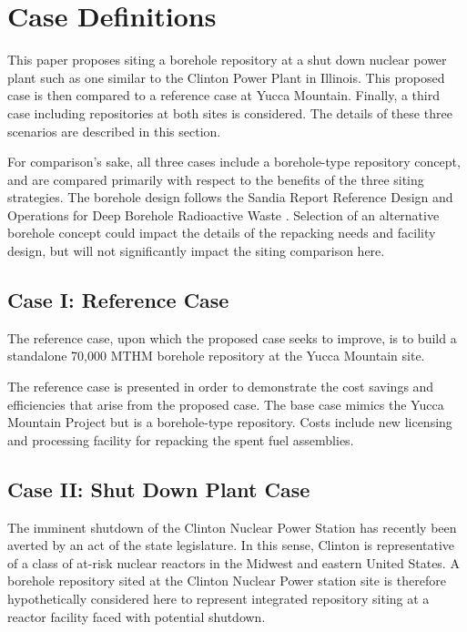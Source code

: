 
\section{Case Definitions}

This paper proposes siting a borehole
 repository at a shut down nuclear power plant such as one similar to the 
 Clinton Power Plant in Illinois. This proposed case is then compared to a 
 reference case at Yucca Mountain. Finally, a third case including repositories 
 at both sites is considered.  The details of these three scenarios are described in this section.

 For comparison's sake, all three cases include a borehole-type repository concept, and are compared 
 primarily with respect to the benefits of the three siting strategies.
The borehole design follows the Sandia Report Reference Design and Operations 
for Deep Borehole Radioactive Waste \cite{arnold_reference_2011}. Selection of 
an alternative borehole concept could impact the details of the repacking needs 
and facility design, but will not significantly impact the siting comparison 
here.
 
\subsection{Case I: Reference Case} 
The reference case, upon which the proposed case seeks to improve, is to build 
a standalone 70,000 \gls{MTHM} borehole repository at the Yucca Mountain site.

The reference case is presented in order to demonstrate the cost savings and efficiencies 
that arise from the proposed case. The base case mimics the Yucca Mountain Project
but is a borehole-type repository. Costs include new licensing and processing facility for repacking the spent fuel assemblies.

\subsection{Case II: Shut Down Plant Case}

The imminent shutdown of the Clinton Nuclear Power Station has recently been 
averted by an act of the state legislature. In this sense, Clinton is 
representative of a class of at-risk nuclear 
reactors in the Midwest and eastern United States. A borehole repository 
sited at the Clinton Nuclear Power station site is therefore hypothetically 
considered here to represent integrated repository siting at a reactor facility 
faced with potential shutdown.

